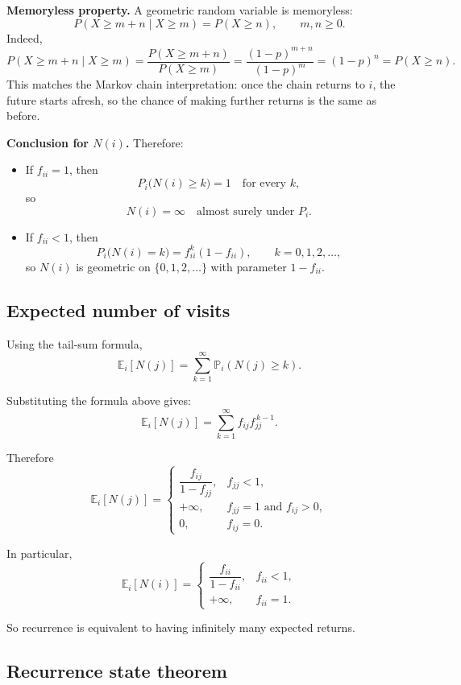 \documentclass[11pt]{article}
\theoremstyle{definition}
\begin{document}
\medskip

\noindent
\textbf{Memoryless property.}
A geometric random variable is memoryless:
\[
P(X\ge m+n\mid X\ge m)=P(X\ge n),
\qquad m,n\ge 0.
\]
Indeed,
\[
P(X\ge m+n\mid X\ge m)
=
\frac{P(X\ge m+n)}{P(X\ge m)}
=
\frac{(1-p)^{m+n}}{(1-p)^m}
=
(1-p)^n
=
P(X\ge n).
\]
This matches the Markov chain interpretation: once the chain returns to \(i\), the future starts afresh, so the chance of making further returns is the same as before.

\medskip

\noindent
\textbf{Conclusion for \(N(i)\).}
Therefore:
\begin{itemize}
    \item If \(f_{ii}=1\), then
    \[
    P_i\bigl(N(i)\ge k\bigr)=1 \quad \text{for every } k,
    \]
    so
    \[
    N(i)=\infty \quad \text{almost surely under } P_i.
    \]

    \item If \(f_{ii}<1\), then
    \[
    P_i\bigl(N(i)=k\bigr)=f_{ii}^k(1-f_{ii}),\qquad k=0,1,2,\dots,
    \]
    so \(N(i)\) is geometric on \(\{0,1,2,\dots\}\) with parameter \(1-f_{ii}\).
\end{itemize}

\subsection{Expected number of visits}

Using the tail-sum formula,
\[
\mathbb E_i[N(j)]
=
\sum_{k=1}^{\infty}\mathbb P_i(N(j)\ge k).
\]

Substituting the formula above gives:
\[
\mathbb E_i[N(j)]
=
\sum_{k=1}^{\infty} f_{ij}f_{jj}^{\,k-1}.
\]

Therefore
\[
\mathbb E_i[N(j)]
=
\begin{cases}
\dfrac{f_{ij}}{1-f_{jj}}, & f_{jj}<1,\\[1em]
+\infty, & f_{jj}=1 \text{ and } f_{ij}>0,\\[0.4em]
0, & f_{ij}=0.
\end{cases}
\]

In particular,
\[
\mathbb E_i[N(i)]
=
\begin{cases}
\dfrac{f_{ii}}{1-f_{ii}}, & f_{ii}<1,\\[1em]
+\infty, & f_{ii}=1.
\end{cases}
\]

So recurrence is equivalent to having infinitely many expected returns.

\subsection{Recurrence state theorem}
\end{document}
